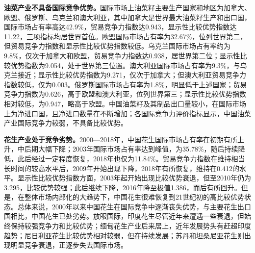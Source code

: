 \documentclass{progbookcn}
\begin{document}
\textbf{油菜产业不具备国际竞争优势。}国际市场上油菜籽主要生产国家和地区为加拿大、欧盟、俄罗斯、乌克兰和澳大利亚，其中加拿大是世界最大油菜籽生产和出口国，国际市场占有率高达42.9\%，贸易竞争力指数达0.943，显示性比较优势指数达11.22，三项指标均居世界首位。欧盟国际市场占有率为32.67\%，位列世界第二，但贸易竞争力指数和显示性比较优势指数较低。乌克兰国际市场占有率约为9.8\%，仅次于加拿大和欧盟，贸易竞争力指数达0.938，居世界第二位；显示性比较优势指数为9.054，处于世界第三位置。澳大利亚国际市场占有率为9.3\%，与乌克兰接近；显示性比较优势指数为9.271，仅次于加拿大；但澳大利亚贸易竞争力指数较低，仅为0.003。俄罗斯国际市场占有率为1.8\%，明显低于上述国家；贸易竞争力指数为0.626，高于欧盟和澳大利亚，位列世界第三；显示性比较优势指数相对较低，为0.947，略高于欧盟。中国油菜籽及其制品出口量较小，在国际市场上为净进口国，且净进口数量在不断增加；各国际竞争力评价指标显示，中国油菜产业国际竞争力较弱，不具备比较优势。

\textbf{花生产业处于竞争劣势。}2000—2018年，中国花生国际市场占有率在初期有所上升，中后期大幅下降；2003年国际市场占有率达到峰值，为35.78\%，随后持续降低，此后经过一定程度恢复，2018年也仅为11.84\%。贸易竞争力指数在维持相当长时间的较高水平后，2009年开始出现下降，2018年有所恢复，维持在0.412的水平。显示性比较优势指数方面，2003年起开始出现比较优势衰退，但至2010年仍为3.295，比较优势较强；此后继续下降，2016年降至极值1.386，而后有所回升。但是，在整体市场内部化的大趋势下，中国花生很难恢复到21世纪初的高比较优势状态。总体来说，2000年以来中国花生在国际竞争中逐渐丧失优势，与主要花生出口国相比，中国花生已处劣势。放眼国际，印度花生尽管近年来遭遇一些衰退，但始终保持较强竞争力和比较优势；缅甸花生产业后来居上，近年发展势头有赶超印度趋势；尼日利亚花生比较优势相对较弱，但在持续发展；苏丹和坦桑尼亚花生则出现明显竞争衰退，正逐步失去国际市场。
\end{document}
